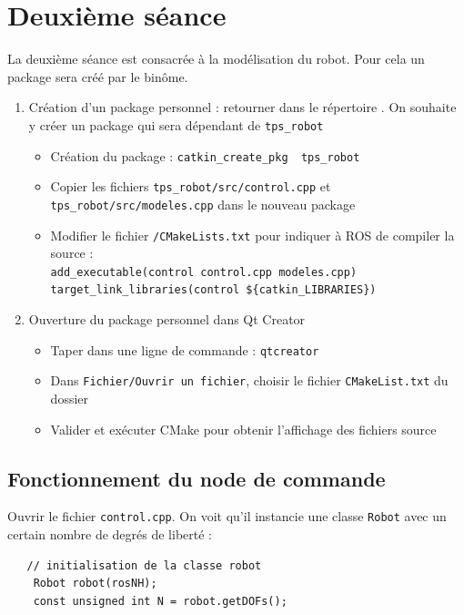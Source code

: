 \documentclass[12pt,a4paper]{article}
\begin{document}
\newpage
\section{Deuxième séance}
La deuxième séance est consacrée à la modélisation du robot.
Pour cela un package sera créé par le binôme. 
\begin{enumerate}
 \item  Création d'un package personnel : retourner dans le répertoire \texttt{\ros}. On souhaite y créer un package qui sera dépendant de \texttt{tps\_robot}
  \begin{itemize}
   \item Création du package : \texttt{catkin\_create\_pkg \bin~tps\_robot}
   \item Copier les fichiers \texttt{tps\_robot/src/control.cpp} et \texttt{tps\_robot/src/modeles.cpp} dans le nouveau package
   \item Modifier le fichier \texttt{\bin/CMakeLists.txt} pour indiquer à ROS de compiler la source : \\
   \texttt{add\_executable(control control.cpp modeles.cpp) \\ 
   target\_link\_libraries(control \$\{catkin\_LIBRARIES\})}
  \end{itemize}
  \item Ouverture du package personnel dans Qt Creator
  \begin{itemize}
 \item Taper dans une ligne de commande : \texttt{qtcreator}
 \item Dans \texttt{Fichier/Ouvrir un fichier}, choisir le fichier \texttt{CMakeList.txt} du dossier \texttt{\ros}
 \item Valider et exécuter CMake pour obtenir l'affichage des fichiers source
\end{itemize}
\end{enumerate}

\subsection{Fonctionnement du node de commande}

Ouvrir le fichier \texttt{control.cpp}. On voit qu'il instancie une classe \texttt{Robot} avec un certain nombre de degrés de liberté :
\begin{verbatim}
   // initialisation de la classe robot
    Robot robot(rosNH);
    const unsigned int N = robot.getDOFs();
\end{verbatim}
\end{document}
